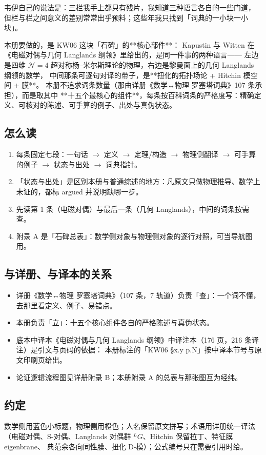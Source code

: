 韦伊自己的说法是：三栏我手上都只有残片，我知道三种语言各自的一些门道，
但栏与栏之间意义的差别常常出乎预料；这些年我只找到「词典的一小块一小块」。

本册要做的，是 KW06 这块「石碑」的**核心部件**：
Kapustin 与 Witten 在《电磁对偶与几何 Langlands 纲领》里给出的，是同一件事的两种语言——
左边是四维 $\mathcal N=4$ 超对称杨–米尔斯理论的物理，右边是黎曼面上的几何 Langlands 纲领的数学，
中间那条可逐句对译的带子，是**扭化的拓扑场论 + Hitchin 模空间 + 膜**。
本册不追求词条数量（那由详册《数学↔物理 罗塞塔词典》107 条承担），而是取其中
**十五个最核心的组件**，每条按百科词条的严格度写：精确定义、可核对的陈述、可手算的例子、出处与真伪状态。

\subsection*{怎么读}
\begin{enumerate}[label=\arabic*.,leftmargin=1.6em]
\item 每条固定七段：一句话 $\to$ 定义 $\to$ 定理/构造 $\to$ 物理侧翻译 $\to$ 可手算的例子 $\to$ 状态与出处 $\to$ 词典指针。
\item 「状态与出处」是区别本册与普通综述的地方：凡原文只做物理推导、数学上未证的，都标 argued 并说明缺哪一步。
\item 先读第 1 条（电磁对偶）与最后一条（几何 Langlands），中间的词条按需查。
\item 附录 A 是「石碑总表」：数学侧对象与物理侧对象的逐行对照，可当导航图用。
\end{enumerate}

\subsection*{与详册、与译本的关系}
\begin{itemize}[leftmargin=1.4em]
\item 详册《数学↔物理 罗塞塔词典》（107 条，7 轨道）负责「查」：一个词不懂，去那里看定义、例子、易错点。
\item 本册负责「立」：十五个核心组件各自的严格陈述与真伪状态。
\item 底本中译本《电磁对偶与几何 Langlands 纲领》中译注本（176 页，216 条译注）是引文与页码的依据：
  本册标注的「KW06 §x.y p.N」按中译本节号与原文印刷页给出。
\item 论证逻辑流程图见详册附录 B；本册附录 A 的总表与那张图互为经纬。
\end{itemize}

\subsection*{约定}
数学侧用蓝色小标题，物理侧用橙色；人名保留原文拼写；术语用详册统一译法
（电磁对偶、S-对偶、Langlands 对偶群 ${}^{L}G$、Hitchin 保留拉丁、特征膜 eigenbrane、
典范余各向同性膜、扭化 D-模）；公式编号只在需要引用时给。
